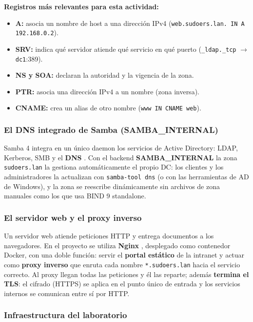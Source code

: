 \textbf{Registros m\'as relevantes para esta actividad:}
\begin{itemize}
  \item \textbf{A:} asocia un nombre de host a una direcci\'on IPv4
        (\texttt{web.sudoers.lan. IN A 192.168.0.2}).
  \item \textbf{SRV:} indica qu\'e servidor atiende qu\'e servicio en qu\'e
        puerto (\texttt{\_ldap.\_tcp} $\rightarrow$ \texttt{dc1}:389).
  \item \textbf{NS y SOA:} declaran la autoridad y la vigencia de la zona.
  \item \textbf{PTR:} asocia una direcci\'on IPv4 a un nombre (zona inversa).
  \item \textbf{CNAME:} crea un alias de otro nombre
        (\texttt{www IN CNAME web}).
\end{itemize}

\subsubsection{El DNS integrado de Samba (SAMBA\_INTERNAL)}

Samba 4 integra en un \'unico daemon los servicios de Active Directory:
LDAP, Kerberos, SMB y el \textbf{DNS} \citep{sambateam2024}. Con el backend
\textbf{SAMBA\_INTERNAL} la zona \texttt{sudoers.lan} la gestiona
autom\'aticamente el propio DC: los clientes y los administradores la
actualizan con \texttt{samba-tool dns} (o con las herramientas de AD de
Windows), y la zona se reescribe din\'amicamente sin archivos de zona
manuales como los que usa BIND 9 standalone.

\subsubsection{El servidor web y el proxy inverso}

Un servidor web atiende peticiones HTTP y entrega documentos a los
navegadores. En el proyecto se utiliza \textbf{Nginx} \citep{nginxDocs},
desplegado como contenedor Docker, con una doble funci\'on: servir el
\textbf{portal est\'atico} de la intranet y actuar como \textbf{proxy inverso}
que enruta cada nombre \texttt{*.sudoers.lan} hacia el servicio correcto. Al
proxy llegan todas las peticiones y \'el las reparte; adem\'as \textbf{termina
el TLS}: el cifrado (HTTPS) se aplica en el punto \'unico de entrada y los
servicios internos se comunican entre s\'i por HTTP.

\subsubsection{Infraestructura del laboratorio}

